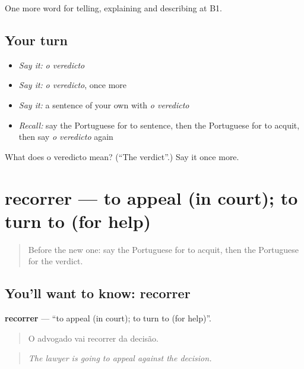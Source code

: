 \begin{grammarlens}[title={What you've built}]
One more word for telling, explaining and describing at B1.
\end{grammarlens}

\subsection*{Your turn}
\begin{itemize}
\raggedright
  \item \emph{Say it:} \emph{o veredicto}
  \item \emph{Say it:} \emph{o veredicto}, once more
  \item \emph{Say it:} a sentence of your own with \emph{o veredicto}
  \item \emph{Recall:} say the Portuguese for to sentence, then the Portuguese for to acquit, then say \emph{o veredicto} again
\end{itemize}

\begin{tcolorbox}[breakable,colback=teal!4,colframe=teal!35!black,title={Before you move on}]
What does o veredicto mean? (\textquotedblleft{}The verdict\textquotedblright{}.) Say it once more.
\end{tcolorbox}
\section[recorrer]{recorrer — to appeal (in court); to turn to (for help)}

\label{lesson:PT-C298-recorrer}



\begin{quote}
Before the new one: say the Portuguese for to acquit, then the Portuguese for the verdict.
\end{quote}

\subsection*{You'll want to know: recorrer}
\textbf{recorrer} — \textquotedblleft{}to appeal (in court); to turn to (for help)\textquotedblright{}.

\begin{quote}
O advogado vai recorrer da decisão.
\end{quote}

\begin{quote}
\emph{The lawyer is going to appeal against the decision.}
\end{quote}

